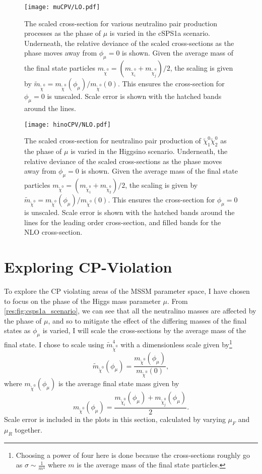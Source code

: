 \documentclass[../main.tex]{subfiles}
\begin{document}
\begin{figure}[ht!]
  \centering
  \texttt{[image: muCPV/LO.pdf]}
  \caption{The scaled cross-section for various neutralino pair production processes as the phase of \(\mu\) is varied in the cSPS1a scenario. Underneath, the relative deviance of the scaled cross-sections as the phase moves away from \(\phi_\mu = 0\) is shown.
  Given the average mass of the final state particles \(m_{\tilde\chi^0} = (m_{\tilde\chi^0_i}+m_{\tilde\chi^0_j})/2\), the scaling is given by \(\tilde{m}_{\tilde\chi^0} = m_{\tilde\chi^0}(\phi_\mu) / m_{\tilde\chi^0}(0)\). This ensures the cross-section for \(\phi_\mu = 0\) is unscaled.
  Scale error is shown with the hatched bands around the lines.}
  \label{res:fig:muCPV}
\end{figure}
\begin{figure}[ht!]
  \centering
  \texttt{[image: hinoCPV/NLO.pdf]}
  \caption{The scaled cross-section for neutralino pair production of \(\tilde\chi^0_1 \tilde\chi^0_2\) as the phase of \(\mu\) is varied in the Higgsino scenario. Underneath, the relative deviance of the scaled cross-sections as the phase moves away from \(\phi_\mu = 0\) is shown.
  Given the average mass of the final state particles \(m_{\tilde\chi^0} = (m_{\tilde\chi^0_1}+m_{\tilde\chi^0_2})/2\), the scaling is given by \(\tilde{m}_{\tilde\chi^0} = m_{\tilde\chi^0}(\phi_\mu) / m_{\tilde\chi^0}(0)\). This ensures the cross-section for \(\phi_\mu = 0\) is unscaled.
  Scale error is shown with the hatched bands around the lines for the leading order cross-section, and filled bands for the NLO cross-section.}
  \label{res:fig:hinoCPV}
\end{figure}
\section{Exploring CP-Violation}
\label{res:sec:CPV}
To explore the CP violating areas of the MSSM parameter space, I have chosen to focus on the phase of the Higgs mass parameter \(\mu\).
From \cref{res:fig:csps1a_scenario}, we can see that all the neutralino masses are affected by the phase of \(\mu\), and so to mitigate the effect of the differing masses of the final states as \(\phi_\mu\) is varied, I will scale the cross-sections by the average mass of the final state.
I chose to scale using \(\tilde{m}_{\tilde\chi^0}^4\) with a dimensionless scale given by\footnote{Choosing a power of four here is done because the cross-sections roughly go as \(\sigma \sim \frac{1}{m^4}\) where \(m\) is the average mass of the final state particles.}
\begin{equation}
  \tilde{m}_{\tilde\chi^0}(\phi_\mu) = \frac{m_{\tilde\chi^0}(\phi_\mu)}{m_{\tilde\chi^0}(0)},
\end{equation}
where \(m_{\tilde\chi^0}(\phi_\mu)\) is the average final state mass given by
\begin{equation}
  m_{\tilde{\chi}^0}(\phi_\mu) = \frac{m_{\tilde\chi^0_i}(\phi_\mu) + m_{\tilde\chi^0_j}(\phi_\mu)}{2}.
\end{equation}
Scale error is included in the plots in this section, calculated by varying \(\mu_F\) and \(\mu_R\) together.
\end{document}
